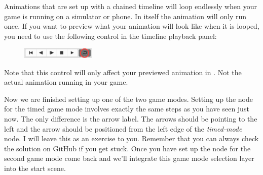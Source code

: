 \begin{details}[frametitle={Looping animations in \SB{}}]
Animations that are set up with a chained timeline will loop endlessly when your
game is running on a simulator or phone. In \SB{} itself the animation will only
run once. If you want to preview what your animation will look like when it is
looped, you need to use the following control in the timeline playback panel:
\begin{figure}[H]
\centering
\includegraphics[width=100pt]{images/Chapter7/loop_timeline.png}
\end{figure}
Note that this control will only affect your previewed animation in \SB{}. Not
the actual animation running in your game.
\end{details}

Now we are finished setting up one of the two game modes. Setting up the node
for the timed game mode involves exactly the same steps as you have seen just
now. The only difference is the arrow label. The arrows should be pointing to
the left and the arrow should be positioned from the left edge of the
\textit{timed-mode} node. I will leave this as an exercise to you. Remember that
you can always check the solution on GitHub if you get stuck. Once you have set
up the node for the second game mode come back and we'll integrate this game
mode selection layer into the start scene.
